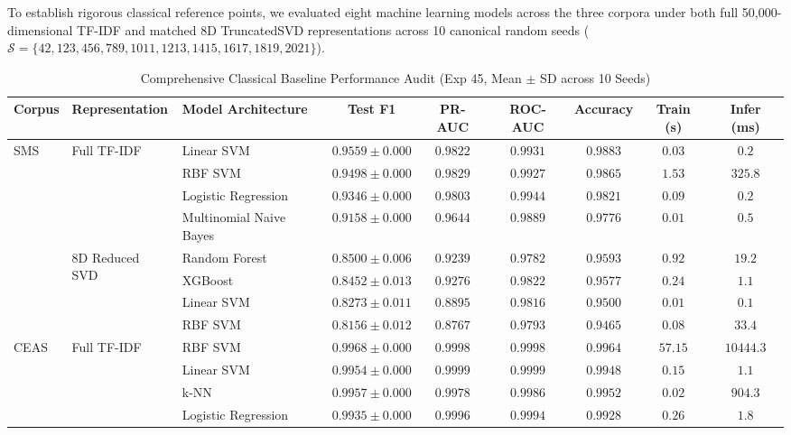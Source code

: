 \documentclass[10pt,letterpaper]{article}
\begin{document}
To establish rigorous classical reference points, we evaluated eight machine learning models across the three corpora under both full 50,000-dimensional TF-IDF and matched 8D TruncatedSVD representations across 10 canonical random seeds ($\mathcal{S} = \{42, 123, 456, 789, 1011, 1213, 1415, 1617, 1819, 2021\}$).

\begin{table}[h!]
\centering
\small
\caption{Comprehensive Classical Baseline Performance Audit (Exp 45, Mean $\pm$ SD across 10 Seeds)}
\label{tab:supp_classical_baselines_full}
\begin{tabular}{lllcccccc}
\toprule
\textbf{Corpus} & \textbf{Representation} & \textbf{Model Architecture} & \textbf{Test F1} & \textbf{PR-AUC} & \textbf{ROC-AUC} & \textbf{Accuracy} & \textbf{Train (s)} & \textbf{Infer (ms)} \\
\midrule
\multirow{8}{*}{SMS} & \multirow{4}{*}{Full TF-IDF} & Linear SVM & $\mathbf{0.9559} \pm 0.000$ & $0.9822$ & $0.9931$ & $0.9883$ & $0.03$ & $0.2$ \\
 & & RBF SVM & $0.9498 \pm 0.000$ & $0.9829$ & $0.9927$ & $0.9865$ & $1.53$ & $325.8$ \\
 & & Logistic Regression & $0.9346 \pm 0.000$ & $0.9803$ & $0.9944$ & $0.9821$ & $0.09$ & $0.2$ \\
 & & Multinomial Naive Bayes & $0.9158 \pm 0.000$ & $0.9644$ & $0.9889$ & $0.9776$ & $0.01$ & $0.5$ \\
\cmidrule{2-9}
 & \multirow{4}{*}{8D Reduced SVD} & Random Forest & $\mathbf{0.8500} \pm 0.006$ & $0.9239$ & $0.9782$ & $0.9593$ & $0.92$ & $19.2$ \\
 & & XGBoost & $0.8452 \pm 0.013$ & $0.9276$ & $0.9822$ & $0.9577$ & $0.24$ & $1.1$ \\
 & & Linear SVM & $0.8273 \pm 0.011$ & $0.8895$ & $0.9816$ & $0.9500$ & $0.01$ & $0.1$ \\
 & & RBF SVM & $0.8156 \pm 0.012$ & $0.8767$ & $0.9793$ & $0.9465$ & $0.08$ & $33.4$ \\
\midrule
\multirow{8}{*}{CEAS} & \multirow{4}{*}{Full TF-IDF} & RBF SVM & $\mathbf{0.9968} \pm 0.000$ & $0.9998$ & $0.9998$ & $0.9964$ & $57.15$ & $10444.3$ \\
 & & Linear SVM & $0.9954 \pm 0.000$ & $0.9999$ & $0.9999$ & $0.9948$ & $0.15$ & $1.1$ \\
 & & k-NN & $0.9957 \pm 0.000$ & $0.9978$ & $0.9986$ & $0.9952$ & $0.02$ & $904.3$ \\
 & & Logistic Regression & $0.9935 \pm 0.000$ & $0.9996$ & $0.9994$ & $0.9928$ & $0.26$ & $1.8$ \\

\end{tabular}
\end{table}
\end{document}
